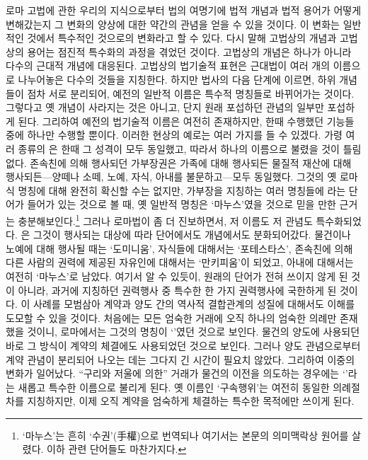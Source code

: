 로마 고법에 관한 우리의 지식으로부터
법의 여명기에 법적 개념과 법적 용어가 어떻게 변해갔는지
그 변화의 양상에 대한 약간의 관념을 얻을 수 있을 것이다.
이 변화는 일반적인 것에서 특수적인 것으로의 변화라고 할 수 있다.
다시 말해 고법상의 개념과 고법상의 용어는 점진적 특수화의 과정을
겪었던 것이다.
고법상의 개념은 하나가 아니라 다수의 근대적 개념에 대응된다.
고법상의 법기술적 표현은 근대법이 여러 개의 이름으로 나누어놓은
다수의 것들을 지칭한다.
하지만 법사의 다음 단계에 이르면,
하위 개념들이 점차 서로 분리되어,
예전의 일반적 이름은 특수적 명칭들로 바뀌어가는 것이다.
그렇다고 옛 개념이 사라지는 것은 아니고,
단지 원래 포섭하던 관념의 일부만 포섭하게 된다.
그리하여 예전의 법기술적 이름은 여전히 존재하지만,
한때 수행했던 기능들 중에 하나만 수행할 뿐이다.
이러한 현상의 예로는 여러 가지를 들 수 있겠다.
가령 여러 종류의 은 한때
그 성격이 모두 동일했고,
따라서 하나의 이름으로 불렸을 것이 틀림없다.
존속친에 의해 행사되던 가부장권은
가족에 대해 행사되든 물질적 재산에 대해 행사되든---양떼나 소떼, 노예,
자식, 아내를 불문하고---모두 동일했다.
그것의 옛 로마식 명칭에 대해 완전히 확신할 수는 없지만,
가부장을 지칭하는 여러 명칭들에
라는 단어가 들어가 있는 것으로 볼 때,
옛 일반적 명칭은 `마누스'였을 것으로 믿을 만한 근거는 충분해보인다.\footnote{%
  `마누스'는 흔히 `수권'(手權)으로 번역되나 여기서는 본문의 의미맥락상
  원어를 살렸다.
  이하 관련 단어들도 마찬가지다.
}
그러나 로마법이 좀 더 진보하면서,
저 이름도 저 관념도 특수화되었다.
은
그것이 행사되는 대상에 따라
단어에서도 개념에서도 분화되어갔다.
물건이나 노예에 대해 행사될 때는
`도미니움',
자식들에 대해서는 `포테스타스',
존속친에 의해 다른 사람의 권력에 제공된 자유인에 대해서는
`만키피움'이 되었고,
아내에 대해서는 여전히 `마누스'로 남았다.
여기서 알 수 있듯이,
원래의 단어가 전혀 쓰이지 않게 된 것이 아니라,
과거에 지칭하던 권력행사 중 특수한 한 가지 권력행사에 국한하게 된 것이다.
이 사례를 모범삼아 계약과 양도 간의 역사적 결합관계의 성질에 대해서도
이해를 도모할 수 있을 것이다.
처음에는 모든 엄숙한 거래에 오직 하나의 엄숙한 의례만
존재했을 것이니,
로마에서는 그것의 명칭이 `'였던 것으로 보인다.
물건의 양도에 사용되던 바로 그 방식이
계약의 체결에도 사용되었던 것으로 보인다.
그러나 양도 관념으로부터 계약 관념이 분리되어 나오는 데는
그다지 긴 시간이 필요치 않았다.
그리하여 이중의 변화가 일어났다.
``구리와 저울에 의한'' 거래가
물건의 이전을 의도하는 경우에는
`'라는 새롭고 특수한 이름으로 불리게 된다.
옛 이름인 `구속행위'는 여전히 동일한 의례절차를 지칭하지만,
이제
오직 계약을 엄숙하게 체결하는 특수한 목적에만 쓰이게 된다.

